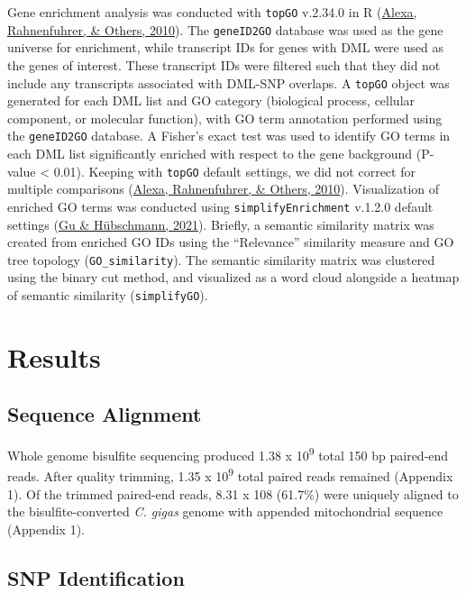 \documentclass [11pt, proquest] {uwthesis}[2015/03/03]
\begin{document}
Gene enrichment analysis was conducted with \texttt{topGO} v.2.34.0 in R (\protect\hyperlink{ref-Alexa2010}{Alexa, Rahnenfuhrer, \& Others, 2010}). The \texttt{geneID2GO} database was used as the gene universe for enrichment, while transcript IDs for genes with DML were used as the genes of interest. These transcript IDs were filtered such that they did not include any transcripts associated with DML-SNP overlaps. A \texttt{topGO} object was generated for each DML list and GO category (biological process, cellular component, or molecular function), with GO term annotation performed using the \texttt{geneID2GO} database. A Fisher's exact test was used to identify GO terms in each DML list significantly enriched with respect to the gene background (P-value \textless{} 0.01). Keeping with \texttt{topGO} default settings, we did not correct for multiple comparisons (\protect\hyperlink{ref-Alexa2010}{Alexa, Rahnenfuhrer, \& Others, 2010}). Visualization of enriched GO terms was conducted using \texttt{simplifyEnrichment} v.1.2.0 default settings (\protect\hyperlink{ref-Gu2021}{Gu \& Hübschmann, 2021}). Briefly, a semantic similarity matrix was created from enriched GO IDs using the ``Relevance'' similarity measure and GO tree topology (\texttt{GO\_similarity}). The semantic similarity matrix was clustered using the binary cut method, and visualized as a word cloud alongside a heatmap of semantic similarity (\texttt{simplifyGO}).

\hypertarget{results-2}{%
\section{Results}\label{results-2}}

\hypertarget{sequence-alignment-1}{%
\subsection{Sequence Alignment}\label{sequence-alignment-1}}

Whole genome bisulfite sequencing produced 1.38 x 10\textsuperscript{9} total 150 bp paired-end reads. After quality trimming, 1.35 x 10\textsuperscript{9} total paired reads remained (Appendix 1). Of the trimmed paired-end reads, 8.31 x 108 (61.7\%) were uniquely aligned to the bisulfite-converted \emph{C. gigas} genome with appended mitochondrial sequence (Appendix 1).

\hypertarget{snp-identification-1}{%
\subsection{SNP Identification}\label{snp-identification-1}}
\end{document}
